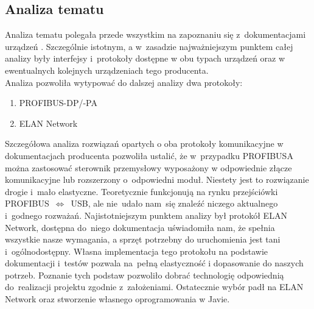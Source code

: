 \subsection{Analiza tematu}
Analiza tematu polegała przede wszystkim na zapoznaniu się z~dokumentacjami urządzeń \cite{u23,u6}. Szczególnie istotnym, a w~zasadzie najważniejszym punktem całej analizy były interfejsy i~protokoły dostępne w obu typach urządzeń oraz w ewentualnych kolejnych urządzeniach tego producenta. \\ \newline
Analiza pozwoliła wytypować do dalszej analizy dwa protokoły:
\begin{enumerate}
\item PROFIBUS-DP/-PA
\item ELAN Network
\end{enumerate}
Szczegółowa analiza rozwiązań opartych o oba protokoły komunikacyjne w dokumentacjach producenta \cite{elan,step7,comm} pozwoliła ustalić, że w~przypadku PROFIBUSA można zastosować sterownik przemysłowy wyposażony w odpowiednie złącze komunikacyjne lub rozszerzony o~odpowiedni moduł. Niestety jest to rozwiązanie drogie i~mało elastyczne. Teoretycznie funkcjonują na rynku przejściówki PROFIBUS~$ \Leftrightarrow $~USB, ale nie~udało nam~się znaleźć niczego aktualnego i~godnego rozważań. Najistotniejszym punktem analizy był protokół ELAN Network, dostępna do~niego dokumentacja \cite{elan} uświadomiła nam, że spełnia wszystkie nasze wymagania, a sprzęt potrzebny do uruchomienia jest tani i~ogólnodostępny. Własna implementacja tego protokołu na podstawie dokumentacji i~testów pozwala na~pełną elastyczność i dopasowanie do naszych potrzeb.
Poznanie tych podstaw pozwoliło dobrać technologię odpowiednią do~realizacji projektu zgodnie z~założeniami. Ostatecznie wybór padł na ELAN Network oraz stworzenie własnego oprogramowania w Javie.

